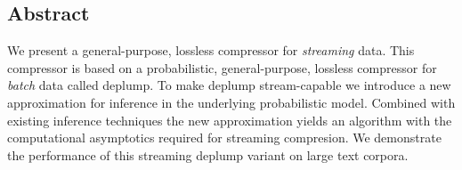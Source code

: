 \subsection*{Abstract}

We present a general-purpose, lossless compressor for {\em streaming} data.  This compressor is based on a probabilistic, general-purpose, lossless compressor for {\em batch} data called deplump.  To make deplump stream-capable we introduce a new approximation for inference in the underlying probabilistic model.  Combined with existing inference techniques the new approximation yields an algorithm with the computational asymptotics required for streaming compresion.  We demonstrate the performance of this streaming deplump variant on large text corpora.